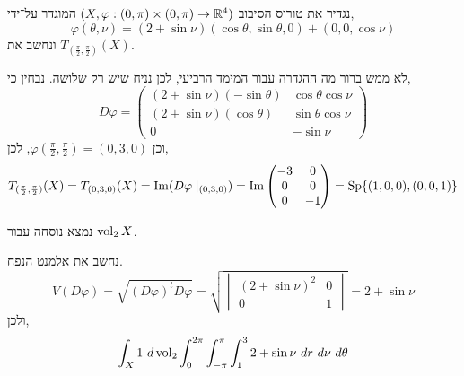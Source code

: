 \subquestion{}
נגדיר את טורוס הסיבוב $(X, \varphi : (0, \pi) \times (0, \pi) \to \mathbb{R}^4)$ המוגדר על־ידי,
\[
	\varphi(\theta, \nu)
	= (2 + \sin \nu) (\cos \theta, \sin \theta, 0) + (0, 0, \cos \nu)
\]
ונחשב את $T_{(\frac{\pi}{2}, \frac{\pi}{2})}(X)$.
\begin{solution}
	לא ממש ברור מה ההגדרה עבור המימד הרביעי, לכן נניח שיש רק שלושה.
	נבחין כי,
	\[
		D\varphi
		= \begin{pmatrix}
			(2 + \sin \nu) (- \sin \theta) & \cos \theta \cos \nu \\
			(2 + \sin \nu) (\cos \theta) & \sin \theta \cos \nu \\
			0 & -\sin \nu
		\end{pmatrix}
	\]
	וכן $\varphi(\frac{\pi}{2}, \frac{\pi}{2}) = (0, 3, 0)$, לכן,
	\[
		T_{(\frac{\pi}{2}, \frac{\pi}{2})}(X)
		= T_{(0, 3, 0)}(X)
		= \operatorname{Im}(D\varphi \mid_{(0, 3, 0)})
		= \operatorname{Im} \begin{pmatrix}
			-3 & 0 \\
			0 & 0 \\
			0 & -1
		\end{pmatrix}
		= \operatorname{Sp}\{(1, 0, 0), (0, 0, 1)\}
	\]
\end{solution}

\subquestion{}
נמצא נוסחה עבור $\operatorname{vol}_2 X$.
\begin{solution}
	נחשב את אלמנט הנפח.
	\[
		V(D \varphi)
		= \sqrt{{(D\varphi)}^t D \varphi}
		= \sqrt{\begin{vmatrix}
				{(2 + \sin \nu)}^2 & 0 \\
				0 & 1
		\end{vmatrix}}
		= 2 + \sin \nu
	\]
	ולכן,
	\[
		\int_X 1\ d\vol_2
		\int_{0}^{2\pi} \int_{-\pi}^{\pi} \int_{1}^{3} 2 + \sin \nu\ dr\ d\nu\ d\theta
	\]
\end{solution}


